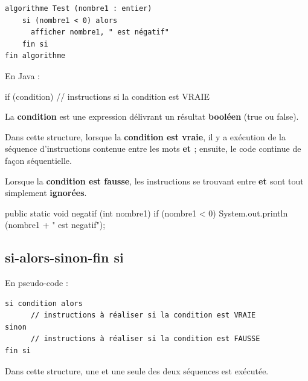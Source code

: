 \documentclass[11pt,a4paper]{article}
\begin{document}
            \par
        \begin{verbatim}
algorithme Test (nombre1 : entier)
    si (nombre1 < 0) alors
      afficher nombre1, " est négatif"
    fin si
fin algorithme
    \end{verbatim}En Java :
            \par
        \begin{Java}
if (condition) { 
      // instructions si la condition est VRAIE
}
      \end{Java}
        La \textbf{condition} est une expression d\'elivrant un r\'esultat 
        \textbf{bool\'een} (true ou false).
      
            \par
        
        Dans cette structure, lorsque la \textbf{condition est vraie}, il y a ex\'ecution 
        de la s\'equence d'instructions contenue entre les mots \textbf{{} 
        et \textbf{}} ; ensuite, le code continue de fa\c con s\'equentielle.
      
            \par
        
        Lorsque la \textbf{condition est fausse}, 
        les instructions se trouvant entre \textbf{{} 
        et \textbf{}} sont tout simplement \textbf{ignor\'ees}.
      
            \par
        \begin{Java}
public static void negatif (int nombre1) {
    if (nombre1 < 0) {
        System.out.println (nombre1 + " est negatif");
    }
}
    \end{Java}\subsection{si-alors-sinon-fin si}En pseudo-code :
            \par
        \begin{verbatim}
si condition alors
      // instructions à réaliser si la condition est VRAIE
sinon
      // instructions à réaliser si la condition est FAUSSE
fin si
      \end{verbatim}
        Dans cette structure, une et une seule des deux s\'equences est ex\'ecut\'ee.
      
\end{document}
